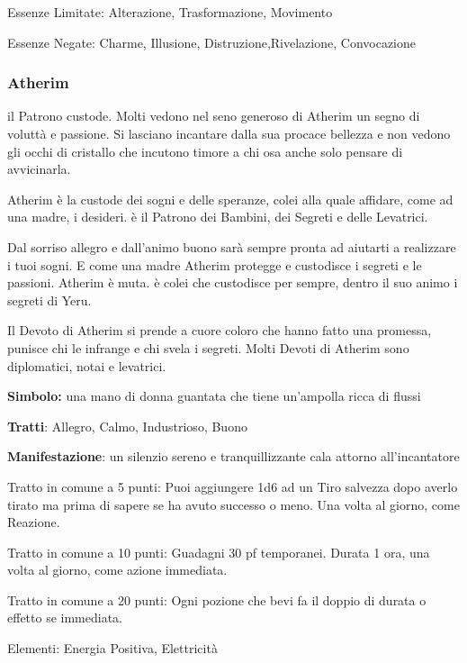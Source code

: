 \documentclass[a4paper,11pt,twoside,openany]{book}
\begin{document}
{Essenze Limitate: Alterazione, Trasformazione, Movimento

Essenze Negate: Charme, Illusione, Distruzione,Rivelazione, Convocazione

\subsubsection{Atherim}

\label{atherim}

il Patrono custode. Molti vedono nel seno generoso di Atherim un segno di voluttà e passione. Si lasciano incantare dalla sua procace bellezza e non vedono gli occhi di cristallo che incutono timore a chi osa anche solo pensare di avvicinarla.

Atherim è la custode dei sogni e delle speranze, colei alla quale affidare, come ad una madre, i desideri. è il Patrono dei Bambini, dei Segreti e delle Levatrici.

Dal sorriso allegro e dall'animo buono sarà sempre pronta ad aiutarti a realizzare i tuoi sogni. E come una madre Atherim protegge e custodisce i segreti e le passioni. Atherim è muta. è colei che custodisce per sempre, dentro il suo animo i segreti di Yeru.

Il Devoto di Atherim si prende a cuore coloro che hanno fatto una promessa, punisce chi le infrange e chi svela i segreti. Molti Devoti di Atherim sono diplomatici, notai e levatrici.

\textbf{Simbolo:} una mano di donna guantata che tiene un'ampolla ricca di flussi

\textbf{Tratti}: Allegro, Calmo, Industrioso, Buono

\textbf{Manifestazione}: un silenzio sereno e tranquillizzante cala attorno all'incantatore

\bigskip

Tratto in comune a 5 punti: Puoi aggiungere 1d6 ad un Tiro salvezza dopo averlo tirato ma prima di sapere se ha avuto successo o meno. Una volta al giorno, come Reazione.

Tratto in comune a 10 punti: Guadagni 30 pf temporanei. Durata 1 ora, una volta al giorno, come azione immediata.

Tratto in comune a 20 punti: Ogni pozione che bevi fa il doppio di durata o effetto se immediata.

\bigskip

Elementi: Energia Positiva, Elettricità

\bigskip

}
\end{document}
